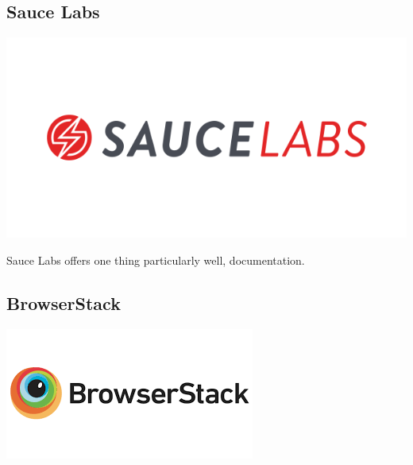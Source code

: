 \subsection{ Sauce Labs }
\includegraphics[scale=0.6]{pwa-toolset-sauce-labs/logo-sauce-labs}

Sauce Labs offers one thing particularly well, documentation.

\subsection{ BrowserStack }
\includegraphics[scale=0.6]{pwa-toolset-sauce-labs/logo-browserstack}
